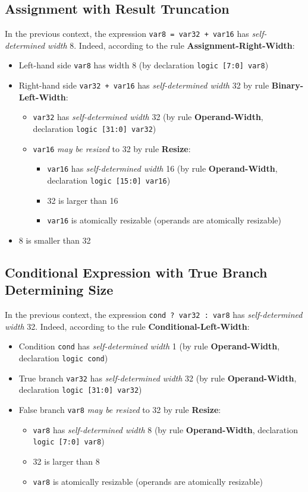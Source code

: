 \documentclass{article}
\newcommand{\sv}[1]{\texttt{#1}}
\newcommand{\sds}{\emph{self-determined width}}
\newcommand{\mbr}{\emph{may be resized}}
\begin{document}
\subsection{Assignment with Result Truncation}

In the previous context, the expression \sv{var8 = var32 + var16} has
\sds{} 8. Indeed, according to the rule \textbf{Assignment-Right-Width}:

\begin{itemize}
  \item Left-hand side \sv{var8} has width 8 (by declaration
    \sv{logic [7:0] var8})
  \item Right-hand side \sv{var32 + var16} has \sds{}
    32 by rule \textbf{Binary-Left-Width}:
    \begin{itemize}
      \item \sv{var32} has \sds{} 32 (by rule
        \textbf{Operand-Width}, declaration \sv{logic [31:0] var32})
      \item \sv{var16} \mbr{} to 32 by rule
        \textbf{Resize}:
        \begin{itemize}
          \item \sv{var16} has \sds{} 16 (by rule
            \textbf{Operand-Width}, declaration \sv{logic [15:0] var16})
          \item 32 is larger than 16
          \item \sv{var16} is atomically resizable (operands are atomically
            resizable)
        \end{itemize}
    \end{itemize}
  \item 8 is smaller than 32
\end{itemize}

\subsection{Conditional Expression with True Branch Determining Size}

In the previous context, the expression \sv{cond ? var32 : var8} has
\sds{} 32. Indeed, according to the rule \textbf{Conditional-Left-Width}:

\begin{itemize}
  \item Condition \sv{cond} has \sds{} 1 (by rule
    \textbf{Operand-Width}, declaration \sv{logic cond})
  \item True branch \sv{var32} has \sds{} 32 (by rule
    \textbf{Operand-Width}, declaration \sv{logic [31:0] var32})
  \item False branch \sv{var8} \mbr{} to 32 by rule
    \textbf{Resize}:
    \begin{itemize}
      \item \sv{var8} has \sds{} 8 (by rule
        \textbf{Operand-Width}, declaration \sv{logic [7:0] var8})
      \item 32 is larger than 8
      \item \sv{var8} is atomically resizable (operands are atomically
        resizable)
    \end{itemize}
\end{itemize}
\end{document}
